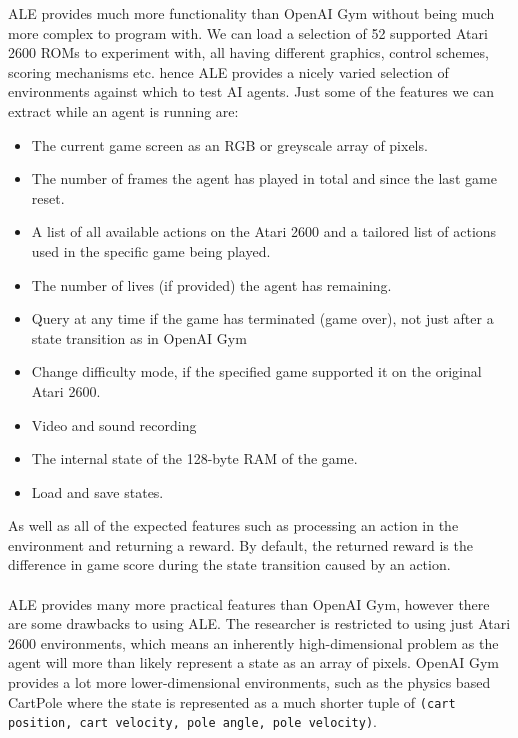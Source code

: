 ALE provides much more functionality than OpenAI Gym without being much more complex to program with. We can load a selection of 52 supported Atari 2600 ROMs to experiment with, all having different graphics, control schemes, scoring mechanisms etc. hence ALE provides a nicely varied selection of environments against which to test AI agents. Just some of the features we can extract while an agent is running are:
\begin{itemize}
    \item The current game screen as an RGB or greyscale array of pixels.
    \item The number of frames the agent has played in total and since the last game reset.
    \item A list of all available actions on the Atari 2600 and a tailored list of actions used in the specific game being played.
    \item The number of lives (if provided) the agent has remaining.
    \item Query at any time if the game has terminated (game over), not just after a state transition as in OpenAI Gym
    \item Change difficulty mode, if the specified game supported it on the original Atari 2600.
    \item Video and sound recording
    \item The internal state of the 128-byte RAM of the game. 
    \item Load and save states.
\end{itemize} 

As well as all of the expected features such as processing an action in the environment and returning a reward. By default, the returned reward is the difference in game score during the state transition caused by an action. \paragraph{}

ALE provides many more practical features than OpenAI Gym, however there are some drawbacks to using ALE. The researcher is restricted to using just Atari 2600 environments, which means an inherently high-dimensional problem as the agent will more than likely represent a state as an array of pixels. OpenAI Gym provides a lot more lower-dimensional environments, such as the physics based CartPole where the state is represented as a much shorter tuple of \texttt{(cart position, cart velocity, pole angle, pole velocity)}.

